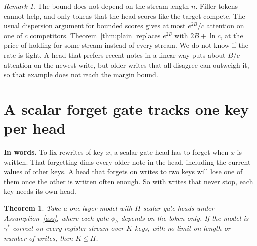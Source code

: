 \documentclass[10pt]{article}
\newtheorem{theorem}{Theorem}
\theoremstyle{definition}
\theoremstyle{remark}
\newtheorem*{remark}{Remark}
\newcommand{\inwords}[1]{\par\smallskip\noindent\textbf{In words.} #1\par\smallskip}
\begin{document}
\begin{remark}
The bound does not depend on the stream length $n$. Filler tokens cannot help, and only tokens that the head scores like the target compete. The usual dispersion argument for bounded scores \cite{softmaxnotenough} gives at most $e^{2B}/c$ attention on one of $c$ competitors. Theorem~\ref{thm:plain} replaces $e^{2B}$ with $2B + \ln c$, at the price of holding for some stream instead of every stream. We do not know if the rate is tight. A head that prefers recent notes in a linear way puts about $B/c$ attention on the newest write, but older writes that all disagree can outweigh it, so that example does not reach the margin bound.
\end{remark}

\section{A scalar forget gate tracks one key per head}\label{sec:scalar}

\inwords{To fix rewrites of key $x$, a scalar-gate head has to forget when $x$ is written. That forgetting dims every older note in the head, including the current values of other keys. A head that forgets on writes to two keys will lose one of them once the other is written often enough. So with writes that never stop, each key needs its own head.}

\begin{theorem}\label{thm:scalar}
Take a one-layer model with $H$ scalar-gate heads under Assumption~\ref{ass}, where each gate $\phi_h$ depends on the token only. If the model is $\gamma^*$-correct on every register stream over $K$ keys, with no limit on length or number of writes, then $K \le H$.
\end{theorem}
\end{document}
